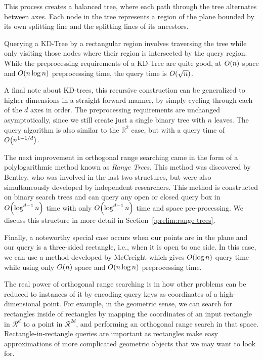 This process creates a balanced tree, where each path through the tree alternates between axes.
Each node in the tree represents a region of the plane bounded by its own splitting line and the splitting lines of its ancestors.

Querying a KD-Tree by a rectangular region involves traversing the tree while only visiting those nodes where their region is intersected by the query region.
While the preprocessing requirements of a KD-Tree are quite good, at $O\!\left(n\right)$ space and $O\!\left(n\log{n}\right)$ preprocessing time, the query time is $O\!\left(\sqrt{n}\right)$.

A final note about KD-trees, this recursive construction can be generalized to higher dimensions in a straight-forward manner, by simply cycling through each of the $d$ axes in order.
The preprocessing requirements are unchanged asymptotically, since we still create just a single binary tree with $n$ leaves.
The query algorithm is also similar to the $\mathbb{R}^2$ case, but with a query time of $O\!\left(n^{1-1/d}\right)$.

The next improvement in orthogonal range searching came in the form of a polylogarithmic method known as \emph{Range Trees}. 
This method was discovered by Bentley\cite{Bentley79}, who was involved in the last two structures, but  were also simultaneously developed by independent researchers.
This method is constructed on binary search trees and can query any open or closed query box in $O\!\left(\log^{d-1}{n}\right)$ time with only $O\!\left(\log^{d-1}{n}\right)$ time and space pre-processing.
We discuss this structure in more detail in Section~\ref{:prelim:range-trees}.


Finally, a noteworthy special case occurs when our points are in the plane and our query is a three-sided rectangle, i.e., when it is open to one side.
In this case, we can use a method developed by McCreight\cite{McCreight85} which gives $O\!\left(\log{n}\right)$ query time while using only $O\!\left(n\right)$ space and $O\!\left(n\log{n}\right)$ preprocessing time.

The real power of orthogonal range searching is in how other problems can be reduced to instances of it by encoding query keys as coordinates of a high-dimensional point.  
For example, in the geometric sense, we can search for rectangles inside of rectangles by mapping the coordinates of an input rectangle in $\mathcal{R}^{d}$ to a point in $\mathcal{R}^{2d}$, and performing an orthogonal range search in that space.
Rectangle-in-rectangle queries are important as rectangles make easy approximations of more complicated geometric objects that we may want to look for.

